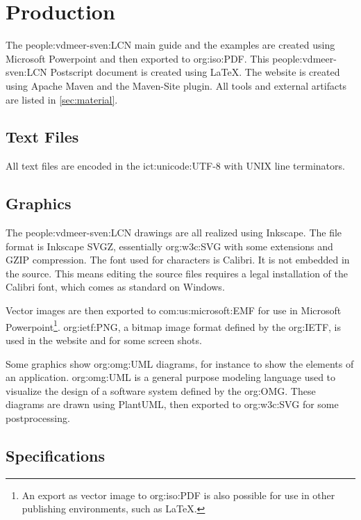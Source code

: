 \section{Production}
\label{sec:production}

    The \ac{people:vdmeer-sven:LCN} main guide and the examples are created using Microsoft Powerpoint and then exported to \acs{org:iso:PDF}.
    This \ac{people:vdmeer-sven:LCN} Postscript document is created using \LaTeX.
    The website is created using Apache Maven and the Maven-Site plugin.
    All tools and external artifacts are listed in \autoref{sec:material}.


\subsection{Text Files}
    All text files are encoded in the \acs{ict:unicode:UTF}-8 with UNIX line terminators.


\subsection{Graphics}

    The \ac{people:vdmeer-sven:LCN} drawings are all realized using Inkscape.
    The file format is Inkscape SVGZ, essentially \ac{org:w3c:SVG} with some extensions and GZIP compression.
    The font used for characters is Calibri.
    It is not embedded in the source.
    This means editing the source files requires a legal installation of the Calibri font, which comes as standard on Windows.

    Vector images are then exported to \ac{com:us:microsoft:EMF} for use in Microsoft Powerpoint\footnote{An export as vector image to \acs{org:iso:PDF} is also possible for use in other publishing environments, such as \LaTeX.}.
    \ac{org:ietf:PNG}, a bitmap image format defined by the \acs{org:IETF}, is used in the website and for some screen shots.

    Some graphics show \ac{org:omg:UML} diagrams, for instance to show the elements of an application.
    \ac{org:omg:UML} is a general purpose modeling language used to visualize the design of a software system defined by the \acs{org:OMG}.
    These diagrams are drawn using PlantUML, then exported to \ac{org:w3c:SVG} for some postprocessing.


\subsection{Specifications}

